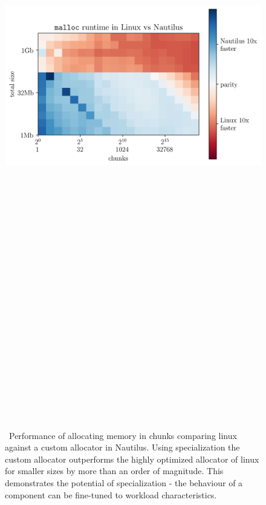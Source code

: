 \documentclass[final]{beamer}
\newlength{\onecolwid}
\begin{document}
\begin{frame}[t]
\begin{columns}[t]
\begin{column}{\onecolwid}
\begin{figure}
        \includegraphics[height=30cm]{plots/malloc.png}
        \label{fig:malloc}
        \caption{~Performance of allocating memory in chunks comparing linux against a custom  allocator in Nautilus. Using specialization the custom allocator outperforms the highly optimized allocator of linux for smaller sizes by more than an order of magnitude. This demonstrates the potential of specialization - the behaviour of a component can be fine-tuned to workload characteristics.}
      \end{figure}
      
%      
      
    \end{column}


\end{columns}
\end{frame}
\end{document}
